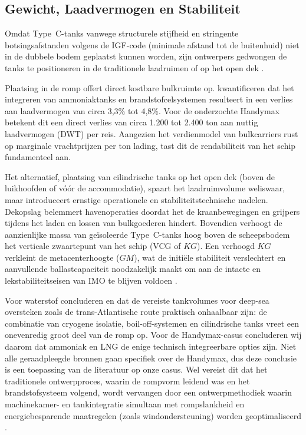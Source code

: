 \documentclass[a4paper]{IMDC2024}
\begin{document}
\subsection{Gewicht, Laadvermogen en Stabiliteit}
Omdat Type~C-tanks vanwege structurele stijfheid en stringente botsingsafstanden volgens de IGF-code (minimale afstand tot de buitenhuid) niet in de dubbele bodem geplaatst kunnen worden, zijn ontwerpers gedwongen de tanks te positioneren in de traditionele laadruimen of op het open dek \citep{dahlkewallat2024}. 

Plaatsing in de romp offert direct kostbare bulkruimte op. \citet{dimicco2024} kwantificeren dat het integreren van ammoniaktanks en brandstofcelsystemen resulteert in een verlies aan laadvermogen van circa 3,3\% tot 4,8\%. Voor de onderzochte Handymax betekent dit een direct verlies van circa 1.200 tot 2.400 ton aan nuttig laadvermogen (DWT) per reis. Aangezien het verdienmodel van bulkcarriers rust op marginale vrachtprijzen per ton lading, tast dit de rendabiliteit van het schip fundamenteel aan. 

Het alternatief, plaatsing van cilindrische tanks op het open dek (boven de luikhoofden of vóór de accommodatie), spaart het laadruimvolume weliswaar, maar introduceert ernstige operationele en stabiliteitstechnische nadelen. Dekopslag belemmert havenoperaties doordat het de kraanbewegingen en grijpers tijdens het laden en lossen van bulkgoederen hindert. Bovendien verhoogt de aanzienlijke massa van geïsoleerde Type~C-tanks hoog boven de scheepsbodem het verticale zwaartepunt van het schip (VCG of $KG$). Een verhoogd $KG$ verkleint de metacenterhoogte ($GM$), wat de initiële stabiliteit verslechtert en aanvullende ballastcapaciteit noodzakelijk maakt om aan de intacte en lekstabiliteitseisen van IMO te blijven voldoen \citep{papanikolaou2026}. 

Voor waterstof concluderen \citet{vanhoecke2021challenges} en \citet{vidovic2023} dat de vereiste tankvolumes voor deep-sea oversteken zoals de trans-Atlantische route praktisch onhaalbaar zijn: de combinatie van cryogene isolatie, boil-off-systemen en cilindrische tanks vreet een onevenredig groot deel van de romp op. Voor de Handymax-casus concluderen wij daarom dat ammoniak en LNG de enige technisch integreerbare opties zijn. Niet alle geraadpleegde bronnen gaan specifiek over de Handymax, dus deze conclusie is een toepassing van de literatuur op onze casus. Wel vereist dit dat het traditionele ontwerpproces, waarin de rompvorm leidend was en het brandstofsysteem volgend, wordt vervangen door een ontwerpmethodiek waarin machinekamer- en tankintegratie simultaan met rompslankheid en energiebesparende maatregelen (zoals windondersteuning) worden geoptimaliseerd \citep{lindstad2022,tadros2023}.
\end{document}
